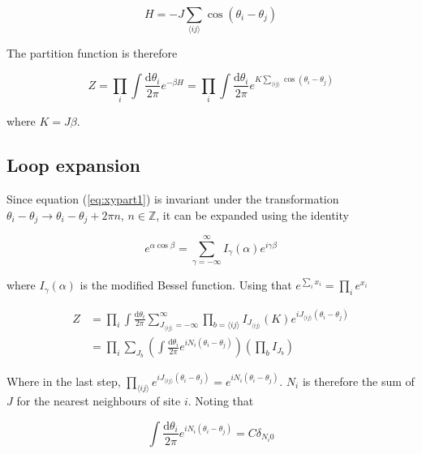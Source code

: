\begin{equation}
    H = - J \sum_{\langle ij \rangle} \cos(\theta_i - \theta_j)
\end{equation}

The partition function is therefore

\begin{equation}
    Z = \prod_i \int \frac{\mathrm d \theta_i}{2 \pi} e^{-\beta H} = \prod_i \int \frac{\mathrm d \theta_i}{2 \pi} e^{K \sum_{\langle ij \rangle} \cos(\theta_i - \theta_j)}
\label{eq:xypart1}
\end{equation}

where $K = J \beta$.

\subsection{Loop expansion}
\label{subsec:XYLoopexp}

Since equation (\ref{eq:xypart1}) is invariant under the transformation $\theta_i - \theta_j \rightarrow \theta_i - \theta_j + 2 \pi n$, $n \in \mathbb{Z}$, it can be expanded using the identity

\begin{equation}
    e^{\alpha \cos \beta} = \sum_{\gamma = -\infty}^{\infty} I_\gamma ( \alpha ) e^{i \gamma \beta}
\end{equation}

where $I_\gamma(\alpha)$ is the modified Bessel function. Using that $e^{\sum_i x_i} = \prod_i e^{x_i}$

\begin{align}
    Z &= \prod_i \int \frac{\mathrm d \theta_i}{2 \pi} \sum_{J_{\langle ij \rangle} = -\infty}^{\infty} \prod_{b = \langle ij \rangle} I_{J_{\langle ij \rangle}} ( K ) e^{i J_{\langle ij \rangle} (\theta_i - \theta_j)} \\
\label{eq:xypart2}
% 
    &=  \prod_i \sum_{J_b} \left ( \int \frac{\mathrm d \theta_i}{2 \pi} e^{i N_i (\theta_i - \theta_j)} \right ) \left ( \prod_b I_{J_b} \right ) 
\end{align}

Where in the last step, $\prod_{\langle ij \rangle} e^{iJ_{\langle ij \rangle} (\theta_i - \theta_j)} = e^{iN_i (\theta_i - \theta_j)}$. $N_i$ is therefore the sum of $J$ for the nearest neighbours of site $i$. Noting that

\begin{equation}
    \int \frac{\mathrm d \theta_i}{2 \pi} e^{i N_i (\theta_i - \theta_j)} = C \delta_{N_i 0}
\end{equation}

